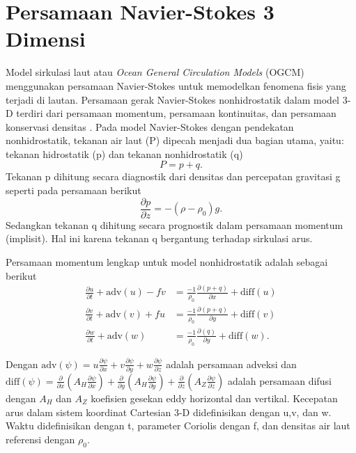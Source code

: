 \section[Persamaan Navier-Stokes 3 Dimensi]{Persamaan Navier-Stokes 3 Dimensi}
\begin{spacing}{1.5}
	\par Model sirkulasi laut atau \textit{Ocean General Circulation Models} (OGCM) menggunakan persamaan Navier-Stokes untuk memodelkan fenomena fisis yang terjadi di lautan. Persamaan gerak Navier-Stokes nonhidrostatik dalam model 3-D terdiri dari persamaan momentum, persamaan kontinuitas, dan persamaan konservasi densitas . Pada model Navier-Stokes dengan pendekatan nonhidrostatik, tekanan air laut (P) dipecah menjadi dua bagian utama, yaitu: tekanan hidrostatik (p) dan tekanan nonhidrostatik (q)
	\begin{equation}
		P = p+q.
	\end{equation}
	Tekanan p dihitung secara diagnostik dari densitas  dan percepatan gravitasi g seperti pada persamaan berikut 
	\begin{equation}
		\frac{\partial p}{\partial z} = -(\rho - \rho_0)g.
	\end{equation}
	Sedangkan tekanan q dihitung secara prognostik dalam persamaan momentum (implisit). Hal ini karena tekanan q bergantung terhadap sirkulasi arus.
	\par Persamaan momentum lengkap untuk model nonhidrostatik adalah sebagai berikut
	\begin{equation}
		\begin{aligned}
			\frac{\partial u}{\partial t} + \text{adv}(u)-fv &= \frac{-1}{\rho_0}\frac{\partial(p+q)}{\partial x}+\text{diff}(u) \\
			\frac{\partial v}{\partial t} + \text{adv}(v)+fu &= \frac{-1}{\rho_0}\frac{\partial(p+q)}{\partial y}+\text{diff}(v) \\
			\frac{\partial w}{\partial t} +\text{adv}(w) &= \frac{-1}{\rho_0}\frac{\partial(q)}{\partial y}+\text{diff}(w).
		\end{aligned}	
	\end{equation}
	\par Dengan $\text{adv}(\psi)=u\frac{\partial \psi}{\partial x}+v\frac{\partial \psi}{\partial y}+w\frac{\partial \psi}{\partial z}$ adalah persamaan adveksi dan $\text{diff}(\psi)=\frac{\partial}{\partial x}(A_{H} \frac{\partial \psi}{\partial x})+\frac{\partial}{\partial y}(A_{H} \frac{\partial \psi}{\partial y})+\frac{\partial}{\partial z}(A_{Z} \frac{\partial \psi}{\partial z})$ adalah persamaan difusi dengan $A_H$ dan $A_Z$ koefisien gesekan eddy horizontal dan vertikal. Kecepatan arus dalam sistem koordinat Cartesian 3-D didefinisikan dengan u,v, dan w. Waktu didefinisikan dengan t, parameter Coriolis dengan f, dan densitas air laut referensi dengan $\rho_0$.
	

\end{spacing}
